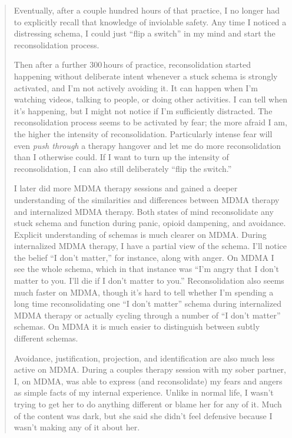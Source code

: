 \documentclass[11pt,oneside]{book}
\begin{document}
\begin{quotation}
    Eventually, after a couple hundred hours of that practice, I no longer had to explicitly recall that knowledge of inviolable safety. Any time I noticed a distressing schema, I could just \enquote{flip a switch} in my mind and start the reconsolidation process.

    Then after a further 300\,hours of practice, reconsolidation started happening without deliberate intent whenever a stuck schema is strongly activated, and I'm not actively avoiding it. It can happen when I'm watching videos, talking to people, or doing other activities. I can tell when it's happening, but I might not notice if I'm sufficiently distracted. The reconsolidation process seems to be activated by fear; the more afraid I am, the higher the intensity of reconsolidation. Particularly intense fear will even \textit{push through} a therapy hangover and let me do more reconsolidation than I otherwise could. If I want to turn up the intensity of reconsolidation, I can also still deliberately \enquote{flip the switch.}

    I later did more MDMA therapy sessions and gained a deeper understanding of the similarities and differences between MDMA therapy and internalized MDMA therapy. Both states of mind reconsolidate any stuck schema and function during panic, opioid dampening, and avoidance. Explicit understanding of schemas is much clearer on MDMA. During internalized MDMA therapy, I have a partial view of the schema. I'll notice the belief \enquote{I don't matter,} for instance, along with anger. On MDMA I see the whole schema, which in that instance was \enquote{I'm angry that I don't matter to you. I'll die if I don't matter to you.} Reconsolidation also seems much faster on MDMA, though it's hard to tell whether I'm spending a long time reconsolidating one \enquote{I don't matter} schema during internalized MDMA therapy or actually cycling through a number of \enquote{I don't matter} schemas. On MDMA it is much easier to distinguish between subtly different schemas.
    
    Avoidance, justification, projection, and identification are also much less active on MDMA. During a couples therapy session with my sober partner, I, on MDMA, was able to express (and reconsolidate) my fears and angers as simple facts of my internal experience. Unlike in normal life, I wasn't trying to get her to do anything different or blame her for any of it. Much of the content was dark, but she said she didn't feel defensive because I wasn't making any of it about her.


\end{quotation}
\end{document}

